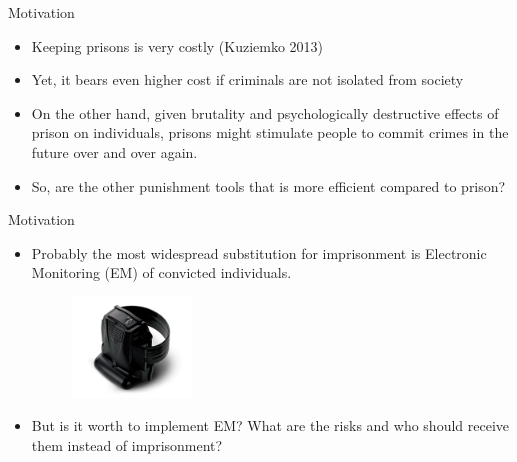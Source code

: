 \documentclass{beamer}
\begin{document}
\begin{frame}{Motivation}
    \begin{itemize}
        \item Keeping prisons is very costly (Kuziemko 2013)
        \item Yet, it bears even higher cost if criminals are not isolated from society
        \item On the other hand, given brutality and psychologically destructive effects of prison on individuals, prisons might stimulate people to commit crimes in the future over and over again.
        \item So, are the other punishment tools that is more efficient compared to prison?
    \end{itemize}
\end{frame}
\begin{frame}{Motivation}
    \begin{itemize}
        \item Probably the most widespread substitution for imprisonment is Electronic Monitoring (EM) of convicted individuals.
\begin{figure}        
\centering
\includegraphics[width=0.3\textwidth]{EM.jpg}
\end{figure}

\item But is it worth to implement EM? What are the risks and who should receive them instead of imprisonment?
\end{itemize}
\end{frame}
\end{document}
